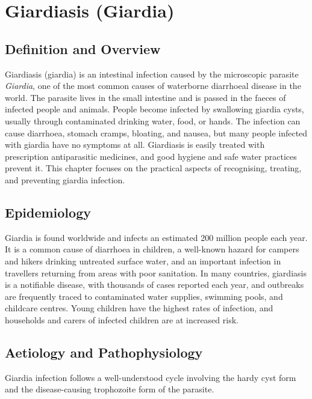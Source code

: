 \chapter{Giardiasis (Giardia)}

\section*{Definition and Overview}
Giardiasis (giardia) is an intestinal infection caused by the microscopic parasite \textit{Giardia}, one of the most common causes of waterborne diarrhoeal disease in the world. The parasite lives in the small intestine and is passed in the faeces of infected people and animals. People become infected by swallowing giardia cysts, usually through contaminated drinking water, food, or hands. The infection can cause diarrhoea, stomach cramps, bloating, and nausea, but many people infected with giardia have no symptoms at all. Giardiasis is easily treated with prescription antiparasitic medicines, and good hygiene and safe water practices prevent it. This chapter focuses on the practical aspects of recognising, treating, and preventing giardia infection.

\section*{Epidemiology}
Giardia is found worldwide and infects an estimated 200 million people each year. It is a common cause of diarrhoea in children, a well-known hazard for campers and hikers drinking untreated surface water, and an important infection in travellers returning from areas with poor sanitation. In many countries, giardiasis is a notifiable disease, with thousands of cases reported each year, and outbreaks are frequently traced to contaminated water supplies, swimming pools, and childcare centres. Young children have the highest rates of infection, and households and carers of infected children are at increased risk.

\section*{Aetiology and Pathophysiology}
Giardia infection follows a well-understood cycle involving the hardy cyst form and the disease-causing trophozoite form of the parasite.

